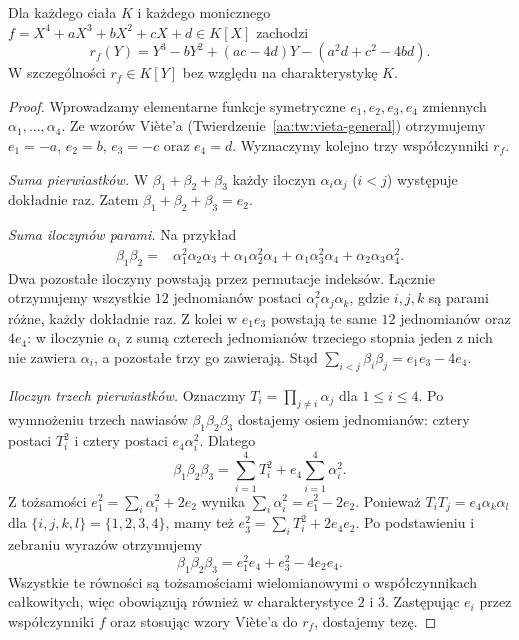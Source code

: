 \begin{twierdzenie}\label{aa:tw:quartic-resolvent-formula}
Dla każdego ciała $K$ i każdego monicznego
$f=X^4+aX^3+bX^2+cX+d\in K[X]$ zachodzi
\[
 r_f(Y)=Y^3-bY^2+(ac-4d)Y-(a^2d+c^2-4bd).
\]
W szczególności $r_f\in K[Y]$ bez względu na charakterystykę $K$.
\end{twierdzenie}
\begin{proof}
Wprowadzamy elementarne funkcje symetryczne $e_1,e_2,e_3,e_4$
zmiennych $\alpha_1,\ldots,\alpha_4$. Ze wzorów Viète'a
(Twierdzenie~\ref{aa:tw:vieta-general}) otrzymujemy
$e_1=-a$, $e_2=b$, $e_3=-c$ oraz $e_4=d$.
Wyznaczymy kolejno trzy współczynniki $r_f$.

\emph{Suma pierwiastków.} W $\beta_1+\beta_2+\beta_3$
każdy iloczyn $\alpha_i\alpha_j$ ($i<j$) występuje dokładnie raz.
Zatem $\beta_1+\beta_2+\beta_3=e_2$.

\emph{Suma iloczynów parami.} Na przykład
\[
\begin{aligned}
 \beta_1\beta_2={}&\alpha_1^2\alpha_2\alpha_3
 +\alpha_1\alpha_2^2\alpha_4
 +\alpha_1\alpha_3^2\alpha_4
 +\alpha_2\alpha_3\alpha_4^2.
\end{aligned}
\]
Dwa pozostałe iloczyny powstają przez permutacje indeksów.
Łącznie otrzymujemy wszystkie $12$ jednomianów postaci
$\alpha_i^2\alpha_j\alpha_k$, gdzie $i,j,k$ są parami różne,
każdy dokładnie raz. Z kolei w $e_1e_3$ powstają te same
$12$ jednomianów oraz $4e_4$: w iloczynie $\alpha_i$ z sumą
czterech jednomianów trzeciego stopnia jeden z nich nie zawiera
$\alpha_i$, a pozostałe trzy go zawierają.
Stąd $\sum_{i<j}\beta_i\beta_j=e_1e_3-4e_4$.

\emph{Iloczyn trzech pierwiastków.} Oznaczmy
$T_i=\prod_{j\ne i}\alpha_j$ dla $1\le i\le4$.
Po wymnożeniu trzech nawiasów $\beta_1\beta_2\beta_3$
dostajemy osiem jednomianów: cztery postaci $T_i^2$ i cztery
postaci $e_4\alpha_i^2$. Dlatego
\[
 \beta_1\beta_2\beta_3=\sum_{i=1}^4 T_i^2
 +e_4\sum_{i=1}^4\alpha_i^2.
\]
Z tożsamości
$e_1^2=\sum_i\alpha_i^2+2e_2$ wynika
$\sum_i\alpha_i^2=e_1^2-2e_2$.
Ponieważ $T_iT_j=e_4\alpha_k\alpha_l$ dla
$\{i,j,k,l\}=\{1,2,3,4\}$,
mamy też
$e_3^2=\sum_iT_i^2+2e_4e_2$.
Po podstawieniu i zebraniu wyrazów otrzymujemy
\[
 \beta_1\beta_2\beta_3=e_1^2e_4+e_3^2-4e_2e_4.
\]
Wszystkie te równości są tożsamościami wielomianowymi
o współczynnikach całkowitych, więc obowiązują również w
charakterystyce $2$ i $3$. Zastępując $e_i$ przez współczynniki
$f$ oraz stosując wzory Viète'a do $r_f$, dostajemy tezę.
\end{proof}

